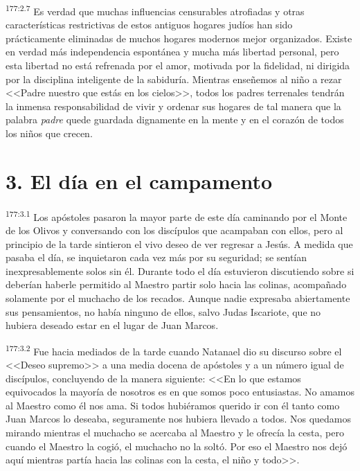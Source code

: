 \par 
\textsuperscript{177:2.7} Es verdad que muchas influencias censurables atrofiadas y otras características restrictivas de estos antiguos hogares judíos han sido prácticamente eliminadas de muchos hogares modernos mejor organizados. Existe en verdad más independencia espontánea y mucha más libertad personal, pero esta libertad no está refrenada por el amor, motivada por la fidelidad, ni dirigida por la disciplina inteligente de la sabiduría. Mientras enseñemos al niño a rezar <<Padre nuestro que estás en los cielos>>, todos los padres terrenales tendrán la inmensa responsabilidad de vivir y ordenar sus hogares de tal manera que la palabra \textit{padre} quede guardada dignamente en la mente y en el corazón de todos los niños que crecen.

\section*{3. El día en el campamento}
\par 
\textsuperscript{177:3.1} Los apóstoles pasaron la mayor parte de este día caminando por el Monte de los Olivos y conversando con los discípulos que acampaban con ellos, pero al principio de la tarde sintieron el vivo deseo de ver regresar a Jesús. A medida que pasaba el día, se inquietaron cada vez más por su seguridad; se sentían inexpresablemente solos sin él. Durante todo el día estuvieron discutiendo sobre si deberían haberle permitido al Maestro partir solo hacia las colinas, acompañado solamente por el muchacho de los recados. Aunque nadie expresaba abiertamente sus pensamientos, no había ninguno de ellos, salvo Judas Iscariote, que no hubiera deseado estar en el lugar de Juan Marcos.

\par 
\textsuperscript{177:3.2} Fue hacia mediados de la tarde cuando Natanael dio su discurso sobre el <<Deseo supremo>> a una media docena de apóstoles y a un número igual de discípulos, concluyendo de la manera siguiente: <<En lo que estamos equivocados la mayoría de nosotros es en que somos poco entusiastas. No amamos al Maestro como él nos ama. Si todos hubiéramos querido ir con él tanto como Juan Marcos lo deseaba, seguramente nos hubiera llevado a todos. Nos quedamos mirando mientras el muchacho se acercaba al Maestro y le ofrecía la cesta, pero cuando el Maestro la cogió, el muchacho no la soltó. Por eso el Maestro nos dejó aquí mientras partía hacia las colinas con la cesta, el niño y todo>>.


